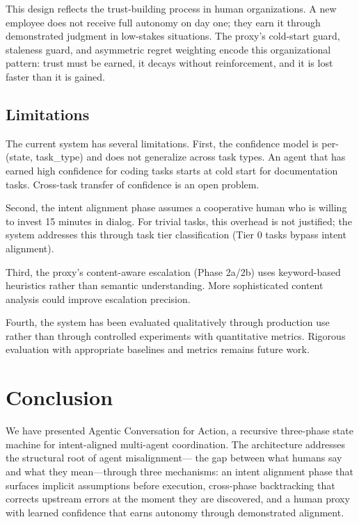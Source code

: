 \documentclass[11pt,a4paper]{article}
\begin{document}
This design reflects the trust-building process in human
organizations. A new employee does not receive full autonomy on
day one; they earn it through demonstrated judgment in low-stakes
situations. The proxy's cold-start guard, staleness guard, and
asymmetric regret weighting encode this organizational pattern:
trust must be earned, it decays without reinforcement, and it is
lost faster than it is gained.

\subsection{Limitations}

The current system has several limitations. First, the confidence
model is per-(state, task\_type) and does not generalize across
task types. An agent that has earned high confidence for coding
tasks starts at cold start for documentation tasks. Cross-task
transfer of confidence is an open problem.

Second, the intent alignment phase assumes a cooperative human who
is willing to invest 15 minutes in dialog. For trivial tasks, this
overhead is not justified; the system addresses this through task
tier classification (Tier 0 tasks bypass intent alignment).

Third, the proxy's content-aware escalation (Phase 2a/2b) uses
keyword-based heuristics rather than semantic understanding. More
sophisticated content analysis could improve escalation precision.

Fourth, the system has been evaluated qualitatively through
production use rather than through controlled experiments with
quantitative metrics. Rigorous evaluation with appropriate baselines
and metrics remains future work.

\section{Conclusion}
\label{sec:conclusion}

We have presented Agentic Conversation for Action, a recursive
three-phase state machine for intent-aligned multi-agent coordination.
The architecture addresses the structural root of agent misalignment---
the gap between what humans say and what they mean---through three
mechanisms: an intent alignment phase that surfaces implicit assumptions
before execution, cross-phase backtracking that corrects upstream errors
at the moment they are discovered, and a human proxy with learned
confidence that earns autonomy through demonstrated alignment.
\end{document}

